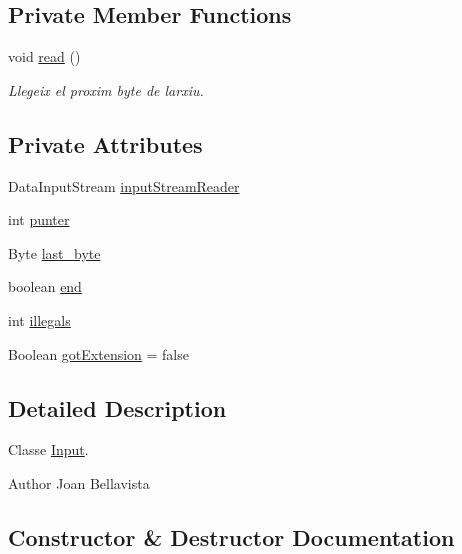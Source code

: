 \subsection*{Private Member Functions}
\begin{DoxyCompactItemize}
\item 
void \hyperlink{classpersistencia_1_1input_1_1Input_a24eae4109b4ff4954ff2d7feef2fa4e4}{read} ()
\begin{DoxyCompactList}\small\item\em Llegeix el proxim byte de l\textquotesingle{}arxiu. \end{DoxyCompactList}\end{DoxyCompactItemize}
\subsection*{Private Attributes}
\begin{DoxyCompactItemize}
\item 
Data\+Input\+Stream \hyperlink{classpersistencia_1_1input_1_1Input_a7b25d54d1a6454a58275174eef12a88b}{input\+Stream\+Reader}
\item 
int \hyperlink{classpersistencia_1_1input_1_1Input_abe76388d0ac9eeafdba673ad2138f8dc}{punter}
\item 
Byte \hyperlink{classpersistencia_1_1input_1_1Input_a45d4bdcdb96823fc8ffe5c1a430727f2}{last\+\_\+byte}
\item 
boolean \hyperlink{classpersistencia_1_1input_1_1Input_aa986cd4af0178e1a80f551dcd8936125}{end}
\item 
int \hyperlink{classpersistencia_1_1input_1_1Input_ad3132949d4ac469b5f4d77373389f9f1}{illegals}
\item 
Boolean \hyperlink{classpersistencia_1_1input_1_1Input_a044330fba061b562ab4a537011c044f3}{got\+Extension} = false
\end{DoxyCompactItemize}


\subsection{Detailed Description}
Classe \hyperlink{classpersistencia_1_1input_1_1Input}{Input}. 

\begin{DoxyAuthor}{Author}
Joan Bellavista 
\end{DoxyAuthor}


\subsection{Constructor \& Destructor Documentation}
\mbox{\label{classpersistencia_1_1input_1_1Input_a9b30ef8d489a1fc5b4aa04a14474349a}} 
